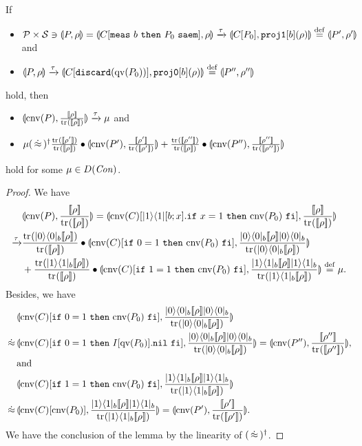 \begin{lem}
 If 
 \begin{itemize}
  \item $ \mathcal{P} \times \mathcal{S} \ni
	\llparenthesis P, \rho \rrparenthesis = \llparenthesis C[{\tt meas}~b~{\tt then}~P_0~{\tt saem}], \rho \rrparenthesis
	\xrightarrow{\tau} 
	\llparenthesis C[P_0], \mathtt{proj1}[b](\rho) \rrparenthesis \overset{\mathrm{def}}{=} \llparenthesis P', \rho' \rrparenthesis$ and
  \item $\llparenthesis P, \rho \rrparenthesis 
	\xrightarrow{\tau} 
	\llparenthesis C[\mathtt{discard}(\mathrm{qv}(P_0))], \mathtt{proj0}[b](\rho) \rrparenthesis \overset{\mathrm{def}}{=}
	\llparenthesis P'', \rho'' \rrparenthesis$
 \end{itemize}
 hold, then 
\begin{itemize}
 \item  $\llparenthesis \mathrm{cnv}(P), \frac{[\![\rho]\!]}{{\rm tr}_{}([\![\rho]\!])} \rrparenthesis 
	\xrightarrow{\tau} \mu$ and
 \item  $\mu (\strg)^\dagger
	\frac{\tr{}{\braw{\rho'}}}{\tr{}{\braw{\rho}}} \bullet
	\con{\cnv{P'}}{\frac{\braw{\rho'}}{\tr{}{\braw{\rho'}}}} +
	\frac{\tr{}{\braw{\rho''}}}{\tr{}{\braw{\rho}}} \bullet
	\con{\cnv{P''}}{\frac{\braw{\rho''}}{\tr{}{\braw{\rho''}}}}$
\end{itemize}
 hold for some $\mu \in D(\mathit{Con})$.
\end{lem}
\begin{proof}
 We have
 \begin{align*}
 &\con{\cnv{P}}{\frac{\braw{\rho}}{\tr{}{\braw{\rho}}}}=
 \con{\cnv{C}[\ket{1}\bra{1}[b;x].\myif{x =
 1}{\cnv{P_0}}]}{\frac{\braw{\rho}}{\tr{}{\braw{\rho}}}}\\
\xrightarrow{\tau}
 &\frac{\tr{}{\ket{0}\bra{0}_b\braw{\rho}}}{\tr{}{\braw{\rho}}} \bullet
 \con{\cnv{C}[\myif{0 =
 1}{\cnv{P_0}}]}{\frac{\ket{0}\bra{0}_b\braw{\rho}\ket{0}\bra{0}_b}
                    {\tr{}{\ket{0}\bra{0}_b\braw{\rho}}}}\\
 &+\frac{\tr{}{\ket{1}\bra{1}_b\braw{\rho}}}{\tr{}{\braw{\rho}}} \bullet
 \con{\cnv{C}[\myif{1 = 1}{\cnv{P_0}}]}{\frac{\ket{1}\bra{1}_b\braw{\rho}
  \ket{1}\bra{1}_b}{
  \tr{}{\ket{1}\bra{1}_b\braw{\rho}}}} \defeq \mu.
\end{align*}
Besides, we have
\begin{align*}
&\con{\cnv{C}[\myif{0 =1}{\cnv{P_0}}]}
 {\frac{\ket{0}\bra{0}_b\braw{\rho}\ket{0}\bra{0}_b}
                    {\tr{}{\ket{0}\bra{0}_b\braw{\rho}}}}
\\
 \strg &\con{\cnv{C}[\myif{0 = 1}{I[\qv{P_0}].\nil}]}
              {\frac{\ket{0}\bra{0}_b\braw{\rho}\ket{0}\bra{0}_b}
                    {\tr{}{\ket{0}\bra{0}_b\braw{\rho}}}} =
        \con{\cnv{P''}}{\frac{\braw{\rho''}}{\tr{}{\braw{\rho''}}}},
\\
&\mbox{and}\\
&\con{\cnv{C}[\myif{1 = 1}{\cnv{P_0}}]}
     {\frac{\ket{1}\bra{1}_b\braw{\rho}\ket{1}\bra{1}_b}
                    {\tr{}{\ket{1}\bra{1}_b\braw{\rho}}}}
\\
 \strg &\con{\cnv{C}[\cnv{P_0}]}
              {\frac{\ket{1}\bra{1}_b\braw{\rho}\ket{1}\bra{1}_b}
                    {\tr{}{\ket{1}\bra{1}_b\braw{\rho}}}} = 
        \con{\cnv{P'}}{\frac{\braw{\rho'}}{\tr{}{\braw{\rho'}}}}.
\end{align*}
We have the conclusion of the lemma by the linearity of
$(\,\dot\approx\,)^\dagger$.
\end{proof}

